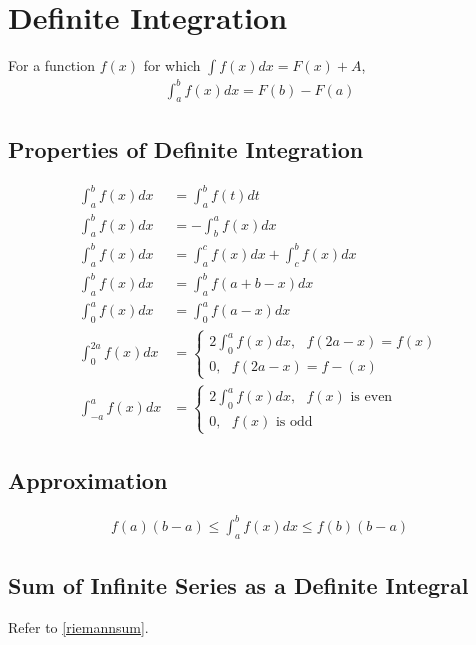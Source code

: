 \documentclass[../main.tex]{subfile}
\begin{document}
\chapter{Definite Integration}

For a function $f(x)$ for which $\int f(x) dx=F(x)+A$,
\begin{align}
    \int_{a}^{b} f(x) dx=F(b)-F(a)
\end{align}

\section{Properties of Definite Integration}
\begin{align}
    \int_{a}^{b} f(x) dx & = \int_{a}^{b} f(t) dt\\
    \int_{a}^{b} f(x) dx & = -\int_{b}^{a} f(x) dx\\
    \int_{a}^{b} f(x) dx & = \int_{a}^{c} f(x) dx+\int_{c}^{b} f(x) dx\\
    \int_{a}^{b} f(x) dx & = \int_{a}^{b} f(a+b-x) dx\\
    \int_{0}^{a} f(x) dx & = \int_{0}^{a} f(a-x) dx\\
    \int_{0}^{2a} f(x) dx & = \begin{cases} 2\int_{0}^{a} f(x) dx,\text{ }f(2a-x)=f(x)\\0,\text{ }f(2a-x)=f-(x)\end{cases}\\
    \int_{-a}^{a} f(x) dx & = \begin{cases} 2\int_{0}^{a} f(x) dx,\text{ }f(x)\text{ is even}\\0,\text{ }f(x)\text{ is odd}\end{cases}
\end{align}

\section{Approximation}
\begin{align}
    f(a) (b-a) \leq \int_a^b f(x) dx \leq f(b) (b-a)
\end{align}

\section{Sum of Infinite Series as a Definite Integral}
Refer to \ref{riemannsum}.
\end{document}
